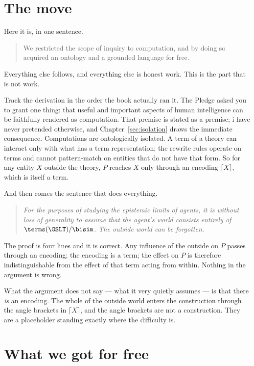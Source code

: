 \section{The move}
\label{sec:the-move}

Here it is, in one sentence.

\begin{quote}
We restricted the scope of inquiry to computation, and by doing so
acquired an ontology and a grounded language for free.
\end{quote}

\noindent
Everything else follows, and everything else is honest work.
This is the part that is not work.

Track the derivation in the order the book actually ran it.
The Pledge asked you to grant one thing: that useful and important
aspects of human intelligence can be faithfully rendered as
computation.
That premise is stated as a premise; i have never pretended
otherwise, and Chapter~\ref{sec:isolation} draws the immediate
consequence.
Computations are ontologically isolated.
A term of a theory can interact only with what has a term
representation; the rewrite rules operate on terms and cannot
pattern-match on entities that do not have that form.
So for any entity $X$ outside the theory, $P$ reaches $X$ only
through an encoding $\lceil X \rceil$, which is itself a term.

And then comes the sentence that does everything.

\begin{quote}
\itshape For the purposes of studying the epistemic limits of
agents, it is without loss of generality to assume that the agent's
world consists entirely of $\terms(\GSLT)/{\bisim}$.
The outside world can be forgotten.
\end{quote}

\noindent
The proof is four lines and it is correct.
Any influence of the outside on $P$ passes through an encoding; the
encoding is a term; the effect on $P$ is therefore
indistinguishable from the effect of that term acting from within.
Nothing in the argument is wrong.

What the argument does not say --- what it very quietly assumes ---
is that there \emph{is} an encoding.
The whole of the outside world enters the construction through the
angle brackets in $\lceil X \rceil$, and the angle brackets are not
a construction.
They are a placeholder standing exactly where the difficulty is.

\section{What we got for free}
\label{sec:free-lunch}

